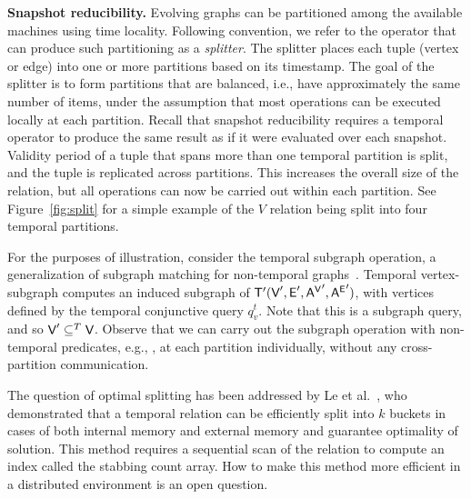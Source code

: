 {\bf Snapshot reducibility.}  Evolving graphs can be partitioned among
the available machines using time locality.  Following convention, we
refer to the operator that can produce such partitioning as a {\em
  splitter}.  The splitter places each tuple (vertex or edge) into one
or more partitions based on its timestamp.  The goal of the splitter
is to form partitions that are balanced, i.e., have approximately the
same number of items, under the assumption that most operations can be
executed locally at each partition.  Recall that snapshot reducibility
requires a temporal operator to produce the same result as if it were
evaluated over each snapshot.  Validity period of a tuple that spans
more than one temporal partition is split, and the tuple is replicated
across partitions.  This increases the overall size of the relation,
but all operations can now be carried out within each partition.  See
Figure~\ref{fig:split} for a simple example of the $V$ relation being
split into four temporal partitions.  

For the purposes of illustration, consider the temporal subgraph
operation, a generalization of subgraph matching for non-temporal
graphs~\cite{PortalarXiv2016}.  Temporal vertex-subgraph
 computes an induced subgraph of \tve $\mathsf{T}'(\textsf{V}',
\textsf{E}', \\ \mathsf{A^{V}}', \mathsf{A^{E}}')$, with vertices defined by the temporal
conjunctive query $q^t_v$.  Note that this is a subgraph query, and so
$\textsf{V}' \subseteq^T \textsf{V}$.  Observe that we can carry out the subgraph
operation with non-temporal predicates, e.g., , at
each partition individually, without any cross-partition
communication.

The question of optimal splitting has been addressed by Le et
al.~\cite{Le2013}, who demonstrated that a temporal relation can be
efficiently split into $k$ buckets in cases of both internal memory
and external memory and guarantee optimality of solution.  This method requires a sequential scan of the relation to
compute an index called the stabbing count array.  How to make this
method more efficient in a distributed environment is an open
question.


